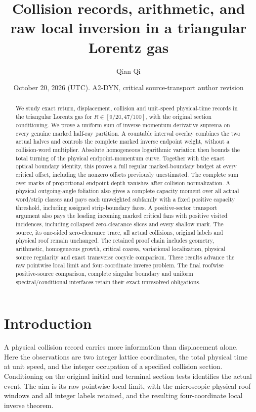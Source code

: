 \documentclass[11pt,reqno]{amsart}
\title[Collision records and raw local inversion]{Collision records, arithmetic, and raw local inversion in a triangular Lorentz gas}
\author{Qian Qi}
\date{October 20, 2026 (UTC). A2-DYN, critical source-transport author revision}
\numberwithin{equation}{section}
\theoremstyle{definition}\newtheorem{definition}[theorem]{Definition}
\theoremstyle{remark}\newtheorem{remark}[theorem]{Remark}
\begin{document}
\raggedbottom
\begin{abstract}
We study exact return, displacement, collision and unit-speed
physical-time records in the triangular Lorentz gas for
$R\in[9/20,47/100]$, with the original section conditioning.
We prove a uniform sum of inverse momentum-derivative suprema
on every genuine marked half-ray partition. A countable interval
overlay combines the two actual halves and controls the complete
marked inverse endpoint weight, without a collision-word multiplier.
Absolute homogeneous logarithmic variation then bounds the total
turning of the physical endpoint-momentum curve. Together with
the exact optical boundary identity, this proves a full regular
marked-boundary budget at every critical offset, including the
nonzero offsets previously unestimated. The complete sum over marks
of proportional endpoint depth vanishes after collision normalization.
A physical outgoing-angle foliation also gives a complete capacity
moment over all actual word/strip classes and pays each unweighted subfamily with a fixed positive capacity threshold, including assigned strip-boundary faces.
A positive-sector transport argument also pays the leading incoming
marked critical fans with positive visited incidences, including
collapsed zero-clearance slices and every shallow mark.
The source, its one-sided zero-clearance trace, all actual collisions,
original labels and physical roof remain unchanged.
The retained proof chain includes geometry, arithmetic, homogeneous
growth, critical coarea, variational localization, physical source
regularity and exact transverse cocycle comparison.
These results advance the raw pointwise local limit and four-coordinate
inverse problem. The final roofwise positive-source comparison,
complete singular boundary and uniform spectral/conditional interfaces
retain their exact unresolved obligations.
\end{abstract}
\maketitle

\section*{Introduction}
A physical collision record carries more information than displacement
alone. Here the observations are two integer lattice coordinates, the
total physical time at unit speed, and the integer occupation of a
specified collision section. Conditioning on the original initial
and terminal section tests identifies the actual event. The aim is
its raw pointwise local limit, with the microscopic physical roof
windows and all integer labels retained, and the resulting
four-coordinate local inverse theorem.
\end{document}
